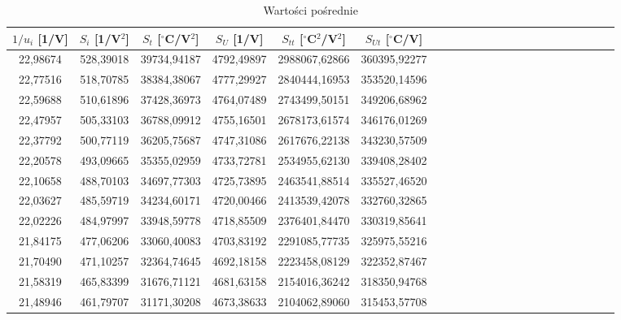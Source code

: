 \documentclass[10pt,a4paper]{article}
\begin{document}
\begin{center}
 \begin{table}[h!]
 \centering
 \caption{Wartości pośrednie}
 \begin{tabular}{|c|c|c|c|c|c|c|c|c|c|c|c|c|c|c|c|c|c|c|c|c|c|}
\hline
$1/u_{i}$ [1/V]     & $S_{i}$ [1/V$^2$]  & $S_{t}$ [$^{\circ}$C/V$^2$] & $S_{U}$ [1/V]& $S_{tt}$ [$^{\circ}$C$^2$/V$^2$] & $S_{Ut}$ [$^{\circ}$C/V]\\ \hline
22,98674 & 528,39018                & 39734,94187                 & 4792,49897                  & 2988067,62866 & 360395,92277 \\ \hline
22,77516 & 518,70785                & 38384,38067                 & 4777,29927                  & 2840444,16953 & 353520,14596 \\ \hline
22,59688 & 510,61896                & 37428,36973                 & 4764,07489                  & 2743499,50151 & 349206,68962 \\ \hline
22,47957 & 505,33103                & 36788,09912                 & 4755,16501                  & 2678173,61574 & 346176,01269 \\ \hline
22,37792 & 500,77119                & 36205,75687                 & 4747,31086                  & 2617676,22138 & 343230,57509 \\ \hline
22,20578 & 493,09665                & 35355,02959                 & 4733,72781                  & 2534955,62130 & 339408,28402 \\ \hline
22,10658 & 488,70103                & 34697,77303                 & 4725,73895                  & 2463541,88514 & 335527,46520 \\ \hline
22,03627 & 485,59719                & 34234,60171                 & 4720,00466                  & 2413539,42078 & 332760,32865 \\ \hline
22,02226 & 484,97997                & 33948,59778                 & 4718,85509                  & 2376401,84470 & 330319,85641 \\ \hline
21,84175 & 477,06206                & 33060,40083                 & 4703,83192                  & 2291085,77735 & 325975,55216 \\ \hline
21,70490 & 471,10257                & 32364,74645                 & 4692,18158                  & 2223458,08129 & 322352,87467 \\ \hline
21,58319 & 465,83399                & 31676,71121                 & 4681,63158                  & 2154016,36242 & 318350,94768 \\ \hline
21,48946 & 461,79707                & 31171,30208                 & 4673,38633                  & 2104062,89060 & 315453,57708 \\ \hline

\end{tabular}
\end{table}
\end{center}
\end{document}
